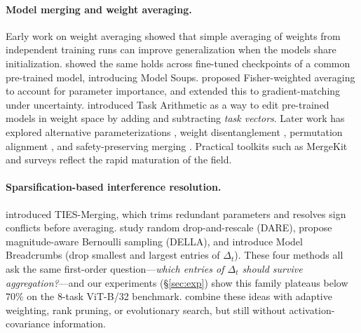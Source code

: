 \documentclass{article} %
\begin{document}
\paragraph{Model merging and weight averaging.} Early work on weight averaging \citep{mcmahan2017communication,stich2018local,izmailov2018averaging,neyshabur2020being,frankle2020linear} showed that simple averaging of weights from independent training runs can improve generalization when the models share initialization. \citet{wortsman2022model} showed the same holds across fine-tuned checkpoints of a common pre-trained model, introducing Model Soups. \citet{matena2022merging} proposed Fisher-weighted averaging to account for parameter importance, and \citet{daheim2024model} extended this to gradient-matching under uncertainty. \citet{ilharco2023editing} introduced Task Arithmetic as a way to edit pre-trained models in weight space by adding and subtracting \emph{task vectors}. Later work has explored alternative parameterizations \citep{ortiz2023task}, weight disentanglement \citep{ortiz2024weight,jin2024fine}, permutation alignment \citep{singh2020neuron,stoica2024zipit}, and safety-preserving merging \citep{bhardwaj2024language}. Practical toolkits such as MergeKit \citep{goddard2024arcee} and surveys \citep{yang2024model} reflect the rapid maturation of the field.

\paragraph{Sparsification-based interference resolution.} \citet{yadav2023tiesmerging} introduced TIES-Merging, which trims redundant parameters and resolves sign conflicts before averaging. \citet{yu2024language} study random drop-and-rescale (DARE), \citet{deep2024della} propose magnitude-aware Bernoulli sampling (DELLA), and \citet{davari2024model} introduce Model Breadcrumbs (drop smallest and largest entries of $\Delta_t$). These four methods all ask the same first-order question---\emph{which entries of $\Delta_t$ should survive aggregation?}---and our experiments (\S\ref{sec:exp}) show this family plateaus below $70\%$ on the 8-task ViT-B/32 benchmark. \citet{adamerging2024,adamerging2024adp,adarank2025,akiba2024evolutionary,huang2024emr} combine these ideas with adaptive weighting, rank pruning, or evolutionary search, but still without activation-covariance information.
\end{document}
